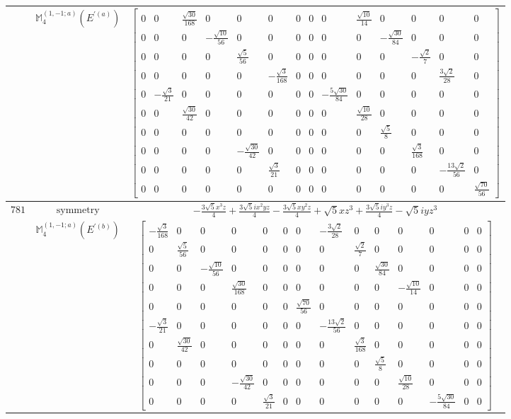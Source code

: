 \documentclass[fleqn,8pt,landscape]{jsarticle}
\begin{document}
\begin{longtable}{ccc}
$  $ & $ \mathbb{M}_{4}^{(1,-1;a)}(E^{\prime(a)}) $ & $ \begin{bmatrix} 0 & 0 & \frac{\sqrt{30}}{168} & 0 & 0 & 0 & 0 & 0 & 0 & \frac{\sqrt{10}}{14} & 0 & 0 & 0 & 0 \\ 0 & 0 & 0 & - \frac{\sqrt{10}}{56} & 0 & 0 & 0 & 0 & 0 & 0 & - \frac{\sqrt{30}}{84} & 0 & 0 & 0 \\ 0 & 0 & 0 & 0 & \frac{\sqrt{5}}{56} & 0 & 0 & 0 & 0 & 0 & 0 & - \frac{\sqrt{2}}{7} & 0 & 0 \\ 0 & 0 & 0 & 0 & 0 & - \frac{\sqrt{3}}{168} & 0 & 0 & 0 & 0 & 0 & 0 & \frac{3 \sqrt{2}}{28} & 0 \\ 0 & - \frac{\sqrt{3}}{21} & 0 & 0 & 0 & 0 & 0 & 0 & - \frac{5 \sqrt{30}}{84} & 0 & 0 & 0 & 0 & 0 \\ 0 & 0 & \frac{\sqrt{30}}{42} & 0 & 0 & 0 & 0 & 0 & 0 & \frac{\sqrt{10}}{28} & 0 & 0 & 0 & 0 \\ 0 & 0 & 0 & 0 & 0 & 0 & 0 & 0 & 0 & 0 & \frac{\sqrt{5}}{8} & 0 & 0 & 0 \\ 0 & 0 & 0 & 0 & - \frac{\sqrt{30}}{42} & 0 & 0 & 0 & 0 & 0 & 0 & \frac{\sqrt{3}}{168} & 0 & 0 \\ 0 & 0 & 0 & 0 & 0 & \frac{\sqrt{3}}{21} & 0 & 0 & 0 & 0 & 0 & 0 & - \frac{13 \sqrt{2}}{56} & 0 \\ 0 & 0 & 0 & 0 & 0 & 0 & 0 & 0 & 0 & 0 & 0 & 0 & 0 & \frac{\sqrt{70}}{56} \end{bmatrix} $ \\ \hline
$ 781 $ & $ \text{symmetry} $ & $ - \frac{3 \sqrt{5} x^{3} z}{4} + \frac{3 \sqrt{5} i x^{2} y z}{4} - \frac{3 \sqrt{5} x y^{2} z}{4} + \sqrt{5} x z^{3} + \frac{3 \sqrt{5} i y^{3} z}{4} - \sqrt{5} i y z^{3} $ \\
$  $ & $ \mathbb{M}_{4}^{(1,-1;a)}(E^{\prime(b)}) $ & $ \begin{bmatrix} - \frac{\sqrt{3}}{168} & 0 & 0 & 0 & 0 & 0 & 0 & - \frac{3 \sqrt{2}}{28} & 0 & 0 & 0 & 0 & 0 & 0 \\ 0 & \frac{\sqrt{5}}{56} & 0 & 0 & 0 & 0 & 0 & 0 & \frac{\sqrt{2}}{7} & 0 & 0 & 0 & 0 & 0 \\ 0 & 0 & - \frac{\sqrt{10}}{56} & 0 & 0 & 0 & 0 & 0 & 0 & \frac{\sqrt{30}}{84} & 0 & 0 & 0 & 0 \\ 0 & 0 & 0 & \frac{\sqrt{30}}{168} & 0 & 0 & 0 & 0 & 0 & 0 & - \frac{\sqrt{10}}{14} & 0 & 0 & 0 \\ 0 & 0 & 0 & 0 & 0 & 0 & \frac{\sqrt{70}}{56} & 0 & 0 & 0 & 0 & 0 & 0 & 0 \\ - \frac{\sqrt{3}}{21} & 0 & 0 & 0 & 0 & 0 & 0 & - \frac{13 \sqrt{2}}{56} & 0 & 0 & 0 & 0 & 0 & 0 \\ 0 & \frac{\sqrt{30}}{42} & 0 & 0 & 0 & 0 & 0 & 0 & \frac{\sqrt{3}}{168} & 0 & 0 & 0 & 0 & 0 \\ 0 & 0 & 0 & 0 & 0 & 0 & 0 & 0 & 0 & \frac{\sqrt{5}}{8} & 0 & 0 & 0 & 0 \\ 0 & 0 & 0 & - \frac{\sqrt{30}}{42} & 0 & 0 & 0 & 0 & 0 & 0 & \frac{\sqrt{10}}{28} & 0 & 0 & 0 \\ 0 & 0 & 0 & 0 & \frac{\sqrt{3}}{21} & 0 & 0 & 0 & 0 & 0 & 0 & - \frac{5 \sqrt{30}}{84} & 0 & 0 \end{bmatrix} $ \\ \hline

\end{longtable}
\end{document}
